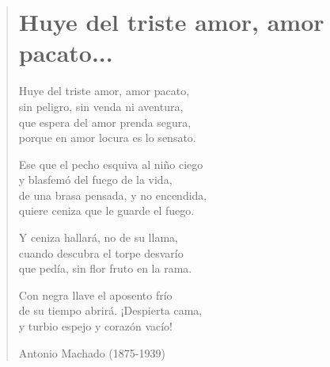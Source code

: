 \documentclass[12pt, twoside]{book}
\begin{document}
\begin{verse}
\begin{center}
\section{Huye del triste amor, amor pacato...}
\end{center}

Huye del triste amor, amor pacato,\\
sin peligro, sin venda ni aventura,\\
que espera del amor prenda segura,\\
porque en amor locura es lo sensato.\newline

Ese que el pecho esquiva al niño ciego\\
y blasfemó del fuego de la vida,\\
de una brasa pensada, y no encendida,\\
quiere ceniza que le guarde el fuego.\newline

Y ceniza hallará, no de su llama,\\
cuando descubra el torpe desvarío\\
que pedía, sin flor fruto en la rama.\newline

Con negra llave el aposento frío\\
de su tiempo abrirá. ¡Despierta cama,\\
y turbio espejo y corazón vacío!\newline

Antonio Machado (1875-1939)

\end{verse}
\newpage
\end{document}
